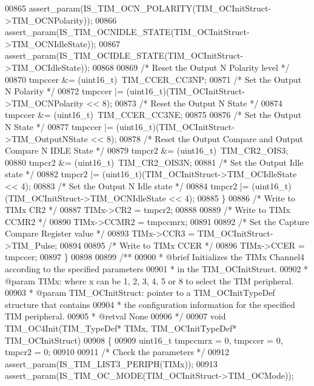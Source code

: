 \begin{DoxyCode}
00865     assert_param(IS\_TIM\_OCN\_POLARITY(TIM\_OCInitStruct->TIM\_OCNPolarity));
00866     assert_param(IS\_TIM\_OCNIDLE\_STATE(TIM\_OCInitStruct->TIM\_OCNIdleState));
00867     assert_param(IS\_TIM\_OCIDLE\_STATE(TIM\_OCInitStruct->TIM\_OCIdleState));
00868 
00869     \textcolor{comment}{/* Reset the Output N Polarity level */}
00870     tmpccer &= (uint16\_t)~TIM_CCER_CC3NP;
00871     \textcolor{comment}{/* Set the Output N Polarity */}
00872     tmpccer |= (uint16\_t)(TIM\_OCInitStruct->TIM_OCNPolarity << 8);
00873     \textcolor{comment}{/* Reset the Output N State */}
00874     tmpccer &= (uint16\_t)~TIM_CCER_CC3NE;
00875 
00876     \textcolor{comment}{/* Set the Output N State */}
00877     tmpccer |= (uint16\_t)(TIM\_OCInitStruct->TIM_OutputNState << 8);
00878     \textcolor{comment}{/* Reset the Output Compare and Output Compare N IDLE State */}
00879     tmpcr2 &= (uint16\_t)~TIM_CR2_OIS3;
00880     tmpcr2 &= (uint16\_t)~TIM_CR2_OIS3N;
00881     \textcolor{comment}{/* Set the Output Idle state */}
00882     tmpcr2 |= (uint16\_t)(TIM\_OCInitStruct->TIM_OCIdleState << 4);
00883     \textcolor{comment}{/* Set the Output N Idle state */}
00884     tmpcr2 |= (uint16\_t)(TIM\_OCInitStruct->TIM_OCNIdleState << 4);
00885   \}
00886   \textcolor{comment}{/* Write to TIMx CR2 */}
00887   TIMx->CR2 = tmpcr2;
00888 
00889   \textcolor{comment}{/* Write to TIMx CCMR2 */}
00890   TIMx->CCMR2 = tmpccmrx;
00891 
00892   \textcolor{comment}{/* Set the Capture Compare Register value */}
00893   TIMx->CCR3 = TIM\_OCInitStruct->TIM\_Pulse;
00894 
00895   \textcolor{comment}{/* Write to TIMx CCER */}
00896   TIMx->CCER = tmpccer;
00897 \}
00898 
00899 \textcolor{comment}{/**}
00900 \textcolor{comment}{  * @brief  Initializes the TIMx Channel4 according to the specified parameters}
00901 \textcolor{comment}{  *         in the TIM\_OCInitStruct.}
00902 \textcolor{comment}{  * @param  TIMx: where x can be 1, 2, 3, 4, 5 or 8 to select the TIM peripheral.}
00903 \textcolor{comment}{  * @param  TIM\_OCInitStruct: pointer to a TIM\_OCInitTypeDef structure that contains}
00904 \textcolor{comment}{  *         the configuration information for the specified TIM peripheral.}
00905 \textcolor{comment}{  * @retval None}
00906 \textcolor{comment}{  */}
00907 \textcolor{keywordtype}{void} TIM_OC4Init(TIM\_TypeDef* TIMx, TIM\_OCInitTypeDef* TIM\_OCInitStruct)
00908 \{
00909   uint16\_t tmpccmrx = 0, tmpccer = 0, tmpcr2 = 0;
00910 
00911   \textcolor{comment}{/* Check the parameters */}
00912   assert_param(IS\_TIM\_LIST3\_PERIPH(TIMx));
00913   assert_param(IS\_TIM\_OC\_MODE(TIM\_OCInitStruct->TIM\_OCMode));

\end{DoxyCode}
